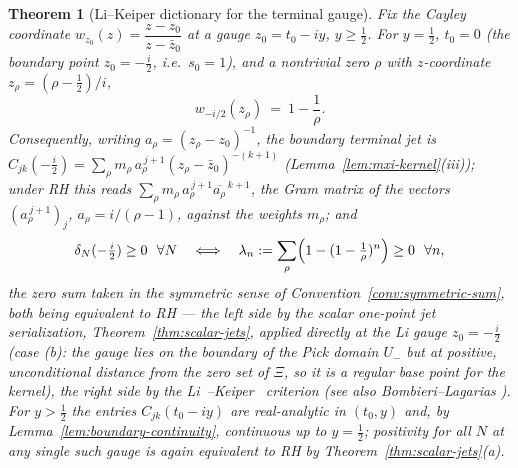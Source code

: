 \documentclass[11pt]{amsart}
\newtheorem{theorem}{Theorem}[section]
\theoremstyle{definition}
\theoremstyle{remark}
\theoremstyle{definition}
\newcommand{\half}{\tfrac{1}{2}}
\begin{document}
\begin{theorem}[Li--Keiper dictionary for the terminal gauge]\label{thm:li-dictionary}
Fix the Cayley coordinate $w_{z_0}(z)=\dfrac{z-z_0}{z-\bar z_0}$ at a gauge $z_0=t_0-iy$, $y\ge\half$.
For $y=\half$, $t_0=0$ (the boundary point $z_0=-\tfrac{i}{2}$, i.e.\ $s_0=1$), and a nontrivial zero
$\rho$ with $z$-coordinate $z_\rho=(\rho-\half)/i$,
\[
   w_{-i/2}(z_\rho)\ =\ 1-\frac1\rho .
\]
Consequently, writing $a_\rho=(z_\rho-z_0)^{-1}$, the boundary terminal jet is
$C_{jk}(-\tfrac{i}{2})=\sum_\rho m_\rho\,a_\rho^{\,j+1}(z_\rho-\bar z_0)^{-(k+1)}$
(Lemma~\ref{lem:mxi-kernel}(iii)); under RH this reads
$\sum_\rho m_\rho\,a_\rho^{\,j+1}\overline{a_\rho}^{\,k+1}$, the Gram
matrix of the vectors $(a_\rho^{\,j+1})_{j}$, $a_\rho=i/(\rho-1)$, against the weights $m_\rho$; and
\[
   \delta_N(-\tfrac{i}{2})\ge0\ \ \forall N
   \quad\Longleftrightarrow\quad
   \lambda_n:=\sum_\rho\Bigl(1-(1-\tfrac1\rho)^n\Bigr)\ge0\ \ \forall n,
\]
the zero sum taken in the symmetric sense of Convention~\ref{conv:symmetric-sum},
both being equivalent to RH --- the left side by the scalar one-point jet serialization,
Theorem~\ref{thm:scalar-jets}, applied \emph{directly at the Li gauge} $z_0=-\tfrac i2$ (case (b): the
gauge lies on the boundary of the Pick domain $U_-$ but at positive, unconditional distance from the
zero set of $\Xi$, so it is a regular base point for the kernel), the right side by the
Li~\cite{Li}--Keiper~\cite{Keiper1992} criterion (see also Bombieri--Lagarias
\cite{BombieriLagarias1999}).  For $y>\half$ the entries $C_{jk}(t_0-iy)$ are real-analytic in $(t_0,y)$ and, by
Lemma~\ref{lem:boundary-continuity}, continuous up to $y=\half$; positivity for all $N$ at any single
such gauge is again equivalent to RH by Theorem~\ref{thm:scalar-jets}(a).
\end{theorem}
\end{document}
